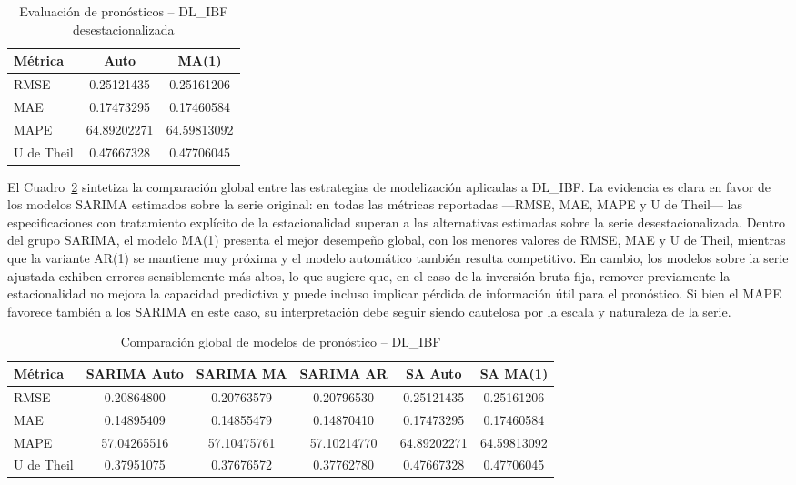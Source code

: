 \documentclass[11pt]{article}
\begin{document}
\begin{table}[H]
\centering
\caption{Evaluación de pronósticos – DL\_IBF desestacionalizada}
\begin{tabular}{lcc}
\hline
Métrica & Auto & MA(1) \\
\hline
RMSE        & 0.25121435 & 0.25161206 \\
MAE         & 0.17473295 & 0.17460584 \\
MAPE        & 64.89202271 & 64.59813092 \\
U de Theil  & 0.47667328 & 0.47706045 \\
\hline
\end{tabular}
\label{tab:forecast_ibf_sa}
\end{table}

El Cuadro~\ref{tab:global_ibf} sintetiza la comparación global entre las estrategias de modelización aplicadas a DL\_IBF. La evidencia es clara en favor de los modelos SARIMA estimados sobre la serie original: en todas las métricas reportadas ---RMSE, MAE, MAPE y U de Theil--- las especificaciones con tratamiento explícito de la estacionalidad superan a las alternativas estimadas sobre la serie desestacionalizada. Dentro del grupo SARIMA, el modelo MA(1) presenta el mejor desempeño global, con los menores valores de RMSE, MAE y U de Theil, mientras que la variante AR(1) se mantiene muy próxima y el modelo automático también resulta competitivo. En cambio, los modelos sobre la serie ajustada exhiben errores sensiblemente más altos, lo que sugiere que, en el caso de la inversión bruta fija, remover previamente la estacionalidad no mejora la capacidad predictiva y puede incluso implicar pérdida de información útil para el pronóstico. Si bien el MAPE favorece también a los SARIMA en este caso, su interpretación debe seguir siendo cautelosa por la escala y naturaleza de la serie.

\begin{table}[H]
\centering
\caption{Comparación global de modelos de pronóstico – DL\_IBF}
\begin{tabular}{lccccc}
\hline
Métrica & SARIMA Auto & SARIMA MA & SARIMA AR & SA Auto & SA MA(1) \\
\hline
RMSE    & 0.20864800 & 0.20763579 & 0.20796530 & 0.25121435 & 0.25161206 \\
MAE     & 0.14895409 & 0.14855479 & 0.14870410 & 0.17473295 & 0.17460584 \\
MAPE    & 57.04265516 & 57.10475761 & 57.10214770 & 64.89202271 & 64.59813092 \\
U de Theil & 0.37951075 & 0.37676572 & 0.37762780 & 0.47667328 & 0.47706045 \\
\hline
\end{tabular}
\label{tab:global_ibf}
\end{table}
\end{document}
